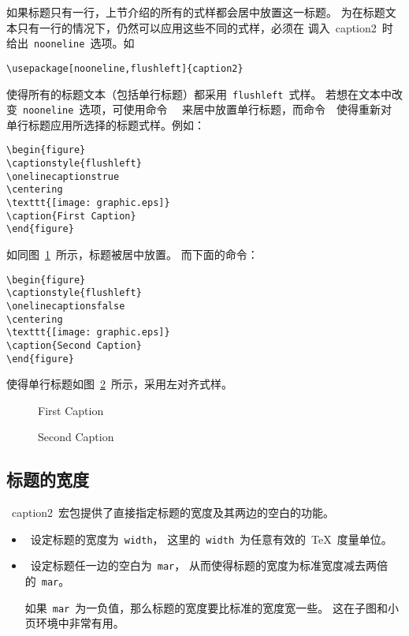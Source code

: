 如果标题只有一行，上节介绍的所有的式样都会居中放置这一标题。
为在标题文本只有一行的情况下，仍然可以应用这些不同的式样，必须在
调入~\textsf{caption2}~时给出~\texttt{nooneline}~选项。如
\begin{Verbatim}[xleftmargin=1cm]
\usepackage[nooneline,flushleft]{caption2}
\end{Verbatim}
使得所有的标题文本（包括单行标题）都采用~\texttt{flushleft}~式样。
若想在文本中改变~\texttt{nooneline}~选项，可使用命令~~
来居中放置单行标题，而命令~~使得重新对
单行标题应用所选择的标题式样。例如：
\begin{Verbatim}[xleftmargin=1cm]
\begin{figure} 
\captionstyle{flushleft} 
\onelinecaptionstrue 
\centering 
\texttt{[image: graphic.eps]} 
\caption{First Caption} 
\end{figure}
\end{Verbatim}
如同图~\ref{fig:centertrue}~所示，标题被居中放置。
而下面的命令：
\begin{Verbatim}[xleftmargin=1cm]
\begin{figure} 
\captionstyle{flushleft} 
\onelinecaptionsfalse
\centering 
\texttt{[image: graphic.eps]} 
\caption{Second Caption}
\end{figure}
\end{Verbatim}
使得单行标题如图~\ref{fig:centerfalse}~所示，采用左对齐式样。

\begin{figure} 
	\onelinecaptionstrue 
	\centering 
	\resizebox{2.5in}{!}{\usebox{\graphic}}
	\caption{First Caption}\label{fig:centertrue}
\end{figure}

\begin{figure} 
	\onelinecaptionsfalse
	\centering 
	\resizebox{2.5in}{!}{\usebox{\graphic}}
	\caption{Second Caption}\label{fig:centerfalse}
\end{figure}

\subsection{标题的宽度}

~\textsf{caption2}~宏包提供了直接指定标题的宽度及其两边的空白的功能。
\begin{itemize}
	\item {}~设定标题的宽度为~\texttt{width}，
	这里的~\texttt{width}~为任意有效的~\TeX{}~度量单位。
	\item {}~设定标题任一边的空白为~\texttt{mar}，
	从而使得标题的宽度为标准宽度减去两倍的~\texttt{mar}。
	
	如果~\texttt{mar}~为一负值，那么标题的宽度要比标准的宽度宽一些。
	这在子图和小页环境中非常有用。
\end{itemize}

